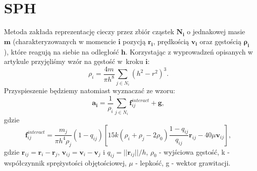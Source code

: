 \section{SPH}
Metoda zakłada reprezentację cieczy przez zbiór cząstek $\mathbf{N_i}$ o jednakowej masie $\mathbf{m}$ (charakteryzowanych w momencie $\mathbf{i}$ pozycją $\mathbf{r_i}$, prędkością $\mathbf{v_i}$ oraz gęstością $\mathbf{\rho_i}$ ), które reagują na siebie na odległość $\mathbf{h}$.
Korzystając z wyprowadzeń opisanych w artykule \cite{website:derive} przyjęliśmy wzór na gęstość w~kroku $\mathbf{i}$:
\[ \rho_i = \frac{4m}{\pi h^8} \sum\limits_{j\in N_i} (h^2-r^2)^3.\]
Przyspieszenie będziemy natomiast wyznaczać ze wzoru:
\[ \mathbf{a_i} = \frac{1}{\rho_i} \sum\limits_{j\in N_i } \mathbf{f}_{ij}^{interact} + \mathbf{g} ,\]
gdzie
\[ \mathbf{f}_{ij}^{interact} = \frac{m_j}{\pi h^4 \rho_j} (1-q_{ij})\left[15k(\rho_i+\rho_j-2\rho_0) 
\frac{1-q_{ij}}{q_{ij}} \mathbf{r}_{ij} - 40\mu \mathbf{v}_{ij} \right] ,\]
gdzie $\mathbf{r}_{ij} = \mathbf{r}_i - \mathbf{r}_j$, $\mathbf{v}_{ij} = \mathbf{v}_i - \mathbf{v}_j$ i $q_{ij} = || \mathbf{r}_{ij} || /h$, $\rho_0$ - wyjściowa gęstość, k - współczynnik sprężystości objętościowej, $\mu$ - lepkość, g - wektor grawitacji.
